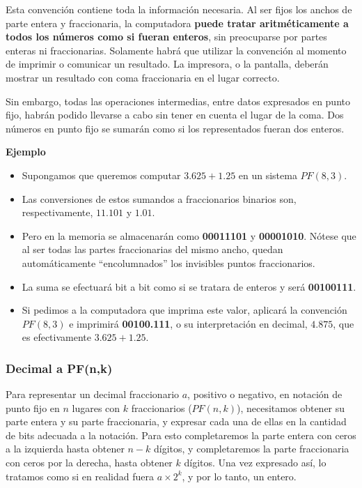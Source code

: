 \documentclass[spanish,A4,]{article}
\begin{document}
Esta convención contiene toda la información necesaria. Al ser fijos los
anchos de parte entera y fraccionaria, la computadora \textbf{puede
tratar aritméticamente a todos los números como si fueran enteros}, sin
preocuparse por partes enteras ni fraccionarias. Solamente habrá que
utilizar la convención al momento de imprimir o comunicar un resultado.
La impresora, o la pantalla, deberán mostrar un resultado con coma
fraccionaria en el lugar correcto.

Sin embargo, todas las operaciones intermedias, entre datos expresados
en punto fijo, habrán podido llevarse a cabo sin tener en cuenta el
lugar de la coma. Dos números en punto fijo se sumarán como si los
representados fueran dos enteros.

\textbf{Ejemplo}

\begin{itemize}
\itemsep1pt\parskip0pt
\item
  Supongamos que queremos computar $3.625 + 1.25$ en un sistema
  $PF(8,3)$.
\item
  Las conversiones de estos sumandos a fraccionarios binarios son,
  respectivamente, $11.101$ y $1.01$.
\item
  Pero en la memoria se almacenarán como \textbf{00011101} y
  \textbf{00001010}. Nótese que al ser todas las partes fraccionarias
  del mismo ancho, quedan automáticamente ``encolumnados'' los
  invisibles puntos fraccionarios.
\item
  La suma se efectuará bit a bit como si se tratara de enteros y será
  \textbf{00100111}.
\item
  Si pedimos a la computadora que imprima este valor, aplicará la
  convención $PF(8,3)$ e imprimirá \textbf{00100.111}, o su
  interpretación en decimal, $4.875$, que es efectivamente
  $3.625 + 1.25$.
\end{itemize}

\subsubsection{Decimal a PF(n,k)}\label{decimal-a-pfnk}

Para representar un decimal fraccionario $a$, positivo o negativo, en
notación de punto fijo en $n$ lugares con $k$ fraccionarios ($PF(n,k)$),
necesitamos obtener su parte entera y su parte fraccionaria, y expresar
cada una de ellas en la cantidad de bits adecuada a la notación. Para
esto completaremos la parte entera con ceros a la izquierda hasta
obtener $n-k$ dígitos, y completaremos la parte fraccionaria con ceros
por la derecha, hasta obtener $k$ dígitos. Una vez expresado así, lo
tratamos como si en realidad fuera $a \times 2^k$, y por lo tanto, un
entero.
\end{document}
